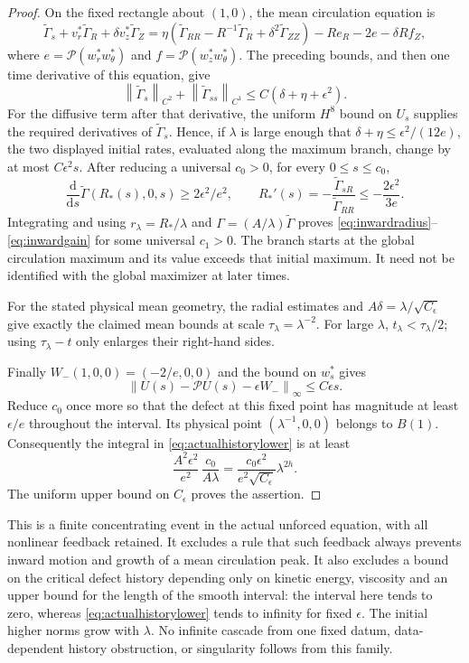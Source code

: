 \documentclass[11pt]{article}
\theoremstyle{remark}
\newcommand{\PP}{\mathcal P}
\newcommand{\norm}[1]{\left\lVert#1\right\rVert}
\begin{document}
\begin{proof}
On the fixed rectangle about $(1,0)$, the mean circulation equation is
\[
 \widetilde\Gamma_s+v^*_r\widetilde\Gamma_R
        +\delta v^*_z\widetilde\Gamma_Z
 =\eta(\widetilde\Gamma_{RR}-R^{-1}\widetilde\Gamma_R
                     +\delta^2\widetilde\Gamma_{ZZ})
       -R e_R-2e-\delta R f_Z,
\]
where $e=\PP(w^*_rw^*_\theta)$ and $f=\PP(w^*_zw^*_\theta)$.
The preceding bounds, and then one time derivative of this equation,
give
\[
 \norm{\widetilde\Gamma_s}_{C^2}
       +\norm{\widetilde\Gamma_{ss}}_{C^1}
                         \leq C(\delta+\eta+\epsilon^2).
\]
For the diffusive term after that derivative, the uniform $H^8$ bound
on $U_s$ supplies the required derivatives of
$\widetilde\Gamma_s$. Hence, if $\lambda$ is large enough that
$\delta+\eta\leq\epsilon^2/(12e)$, the two displayed initial rates,
evaluated along the maximum branch, change by at most $C\epsilon^2s$.
After reducing a universal $c_0>0$, for every $0\leq s\leq c_0$,
\[
 \frac{\mathrm d}{\mathrm ds}
       \widetilde\Gamma(R_*(s),0,s)\geq2\epsilon^2/e^2,
 \qquad
 R_*'(s)=-\frac{\widetilde\Gamma_{sR}}
                    {\widetilde\Gamma_{RR}}
                              \leq-\frac{2\epsilon^2}{3e}.
\]
Integrating and using $r_\lambda=R_*/\lambda$ and
$\Gamma=(A/\lambda)\widetilde\Gamma$ proves
\eqref{eq:inwardradius}--\eqref{eq:inwardgain} for some universal
$c_1>0$. The branch starts at the global circulation maximum and
its value exceeds that initial maximum. It need not be identified
with the global maximizer at later times.

For the stated physical mean geometry, the radial estimates and
$A\delta=\lambda/\sqrt{C_\epsilon}$ give exactly the
claimed mean bounds at scale $\tau_\lambda=\lambda^{-2}$.
For large $\lambda$, $t_\lambda<\tau_\lambda/2$; using
$\tau_\lambda-t$ only enlarges their right-hand sides.

Finally $W_-(1,0,0)=(-2/e,0,0)$ and the bound on $w^*_s$ gives
\[
 \norm{U(s)-\PP U(s)-\epsilon W_-}_\infty\leq C\epsilon s.
\]
Reduce $c_0$ once more so that the defect at this fixed point has
magnitude at least $\epsilon/e$ throughout the interval.
Its physical point $(\lambda^{-1},0,0)$ belongs to $B(1)$.
Consequently the integral in \eqref{eq:actualhistorylower} is at least
\[
 \frac{A^2\epsilon^2}{e^2}\,
       \frac{c_0}{A\lambda}
 =\frac{c_0\epsilon^2}{e^2\sqrt{C_\epsilon}}\lambda^{2h}.
\]
The uniform upper bound on $C_\epsilon$ proves the assertion.
\end{proof}

This is a finite concentrating event in the actual unforced equation,
with all nonlinear feedback retained. It excludes a rule that such
feedback always prevents inward motion and growth of a mean circulation
peak. It also excludes a bound on the critical defect history depending
only on kinetic energy, viscosity and an upper bound for the length of
the smooth interval: the interval here tends to zero, whereas
\eqref{eq:actualhistorylower} tends to infinity for fixed $\epsilon$.
The initial higher norms grow with $\lambda$. No infinite cascade from
one fixed datum, data-dependent history obstruction, or singularity
follows from this family.
\end{document}
